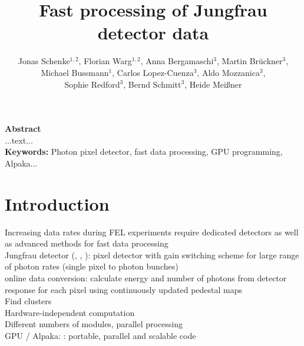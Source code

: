 \documentclass[a4paper]{article}
\begin{document}
\title{Fast processing of Jungfrau detector data}
\author{Jonas Schenke$^{1,2}$, 
Florian Warg$^{1,2}$, 
Anna Bergamaschi$^3$,
Martin Br\"uckner$^3$,\\
Michael Bussmann$^1$,
Carlos Lopez-Cuenza$^3$,
Aldo Mozzanica$^3$,\\
Sophie Redford$^3$,
Bernd Schmitt$^3$,
Heide Mei{\ss}ner}




\date{}

\renewcommand\Affilfont{\itshape}



\maketitle
{\bf Abstract}\\
...text...\\

{\bf Keywords:} Photon pixel detector, fast data processing, GPU programming, Alpaka...



\section{Introduction}

Increasing data rates during FEL experiments require dedicated detectors as well as advanced methods for fast data processing\\

Jungfrau detector (\cite{jungfrau1}, \cite{jungfrau2}, \cite{jungfrau3}): pixel detector with gain switching scheme for large range of photon rates (single pixel to photon bunches)\\

online data conversion: calculate energy and number of photons from detector response for each pixel using continuously updated pedestal maps\\

Find clusters\\

Hardware-independent computation\\

Different numbers of modules, parallel processing\\
	
GPU / Alpaka: \cite{Matthes17}: portable, parallel and scalable code\\
\end{document}
